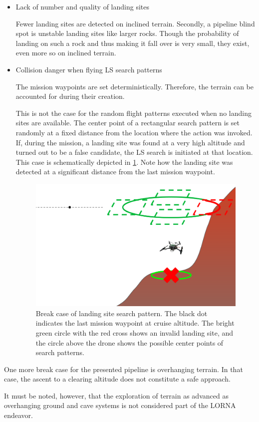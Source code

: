 \begin{itemize}
    \item Lack of number and quality of landing sites

    Fewer landing sites are detected on inclined terrain. Secondly, a pipeline blind spot is unstable landing sites like larger rocks. Though the probability of landing on such a rock and thus making it fall over is very small, they exist, even more so on inclined terrain.

    \item Collision danger when flying LS search patterns

    The mission waypoints are set deterministically. Therefore, the terrain can be accounted for during their creation. 
    
    This is not the case for the random flight patterns executed when no landing sites are available. The center point of a rectangular search pattern is set randomly at a fixed distance from the location where the action was invoked. If, during the mission, a landing site was found at a very high altitude and turned out to be a false candidate, the LS search is initiated at that location. This case is schematically depicted in \cref{fig:search_pattern_collision}. Note how the landing site was detected at a significant distance from the last mission waypoint. 

    \begin{figure}[h]
        \centering
        \includegraphics[scale=0.35]{images/evaluation/search_pattern_collision.png}
        \caption{Break case of landing site search pattern. The black dot indicates the last mission waypoint at cruise altitude. The bright green circle with the red cross shows an invalid landing site, and the circle above the drone shows the possible center points of search patterns.}
        \label{fig:search_pattern_collision}
    \end{figure}
\end{itemize}

One more break case for the presented pipeline is overhanging terrain. In that case, the ascent to a clearing altitude does not constitute a safe approach.

It must be noted, however, that the exploration of terrain as advanced as overhanging ground and cave systems is not considered part of the LORNA endeavor.
